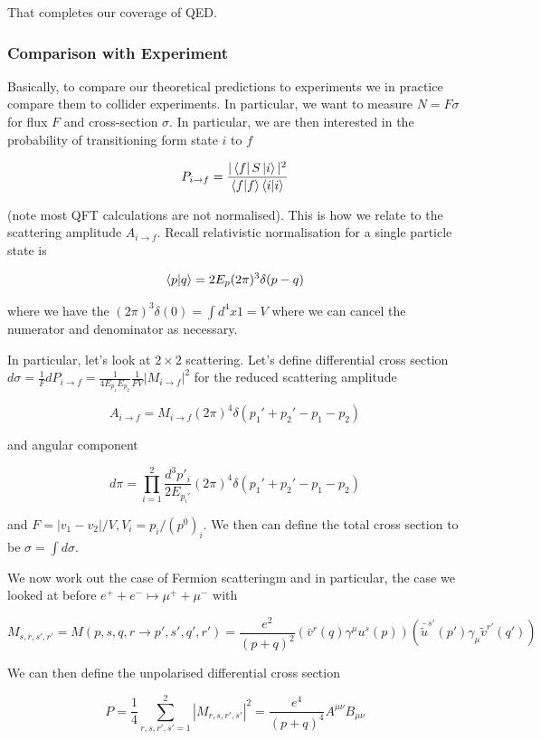 \documentclass{article}
\theoremstyle{definition}
\begin{document}
That completes our coverage of QED.

\subsubsection{Comparison with Experiment}

Basically, to compare our theoretical predictions to experiments we in practice
compare them to collider experiments. In particular, we want to measure $N =
F\sigma$ for flux $F$ and cross-section $\sigma$. In particular, we are then
interested in the probability of transitioning form state $i$ to $f$ 

$$ P_{i \to f} = \frac{|\bra{f} S \ket{i}|^2}{\bra{f}\ket{f} \bra{i}\ket{i}} $$

(note most QFT calculations are not normalised). This is how we relate to the
scattering amplitude $A_{i \to f}$. Recall relativistic normalisation for a
single particle state is

$$ \bra{p}\ket{q} = 2E_p (2\pi)^3 \delta(p - q) $$

where we have the $(2\pi)^3 \delta(0) = \int d^4x 1 = V$ where we can cancel the
numerator and denominator as necessary.

In particular, let's look at $2 \times 2$ scattering. Let's define differential
cross section $d\sigma = \frac{1}{F} dP_{i \to f} = \frac{1}{4 E_{p_1} E_{p_2}}
\frac{1}{FV} |M_{i \to f}|^2$ for the reduced scattering amplitude 

$$A_{i \to f} = M_{i \to f} (2\pi)^4 \delta(p_1' + p_2' - p_1 - p_2)$$  

and angular component

$$ d\pi = \prod_{i = 1}^2 \frac{d^3p'_i}{2E_{p_i'}} (2\pi)^4 \delta(p_1' + p_2'
- p_1 - p_2) $$

and $F = |v_1 - v_2| / V, V_i = p_i / (p^0)_i$. We then can define the total
cross section to be $\sigma = \int d\sigma$.

We now work out the case of Fermion scatteringm and in particular, the case we
looked at before $e^+ + e^- \mapsto \mu^+ + \mu^-$ with

$$ M_{s,r, s', r'} = M(p, s, q, r \to p', s', q', r') = \frac{e^2}{(p + q)^2}
(\bar{v}^r(q) \gamma^\mu u^s(p)) (\bar{\tilde{u}}^{s'}(p') \gamma_\mu
\tilde{v}^{r'}(q')) $$

We can then define the unpolarised differential cross section

$$ P = \frac{1}{4} \sum_{r,s,r',s'=1}^2 |M_{r,s,r',s'}|^2 = \frac{e^4}{(p +
  q)^4} A^{\mu \nu}B_{\mu \nu} $$
\end{document}
